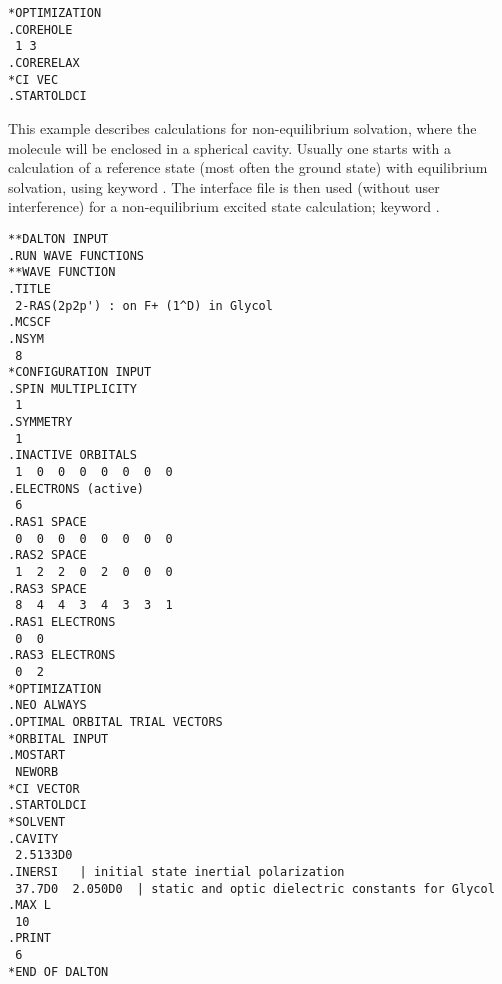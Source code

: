 \begin{verbatim}
*OPTIMIZATION
.COREHOLE
 1 3
.CORERELAX
*CI VEC
.STARTOLDCI
\end{verbatim}
\label{sirius_ex7}

\begin{center}
\end{center}

This example describes calculations for non-equilibrium
solvation, where the mole\-cule will
be enclosed in a spherical cavity. Usually one starts
with a calculation of a reference state (most often the ground
state) with equilibrium solvation, using keyword . The
interface file is then used (without user interference) for a
non-equilibrium excited state calculation; keyword .

\begin{verbatim}
**DALTON INPUT
.RUN WAVE FUNCTIONS
**WAVE FUNCTION
.TITLE
 2-RAS(2p2p') : on F+ (1^D) in Glycol
.MCSCF
.NSYM
 8
*CONFIGURATION INPUT
.SPIN MULTIPLICITY
 1
.SYMMETRY
 1
.INACTIVE ORBITALS
 1  0  0  0  0  0  0  0
.ELECTRONS (active)
 6
.RAS1 SPACE
 0  0  0  0  0  0  0  0
.RAS2 SPACE
 1  2  2  0  2  0  0  0
.RAS3 SPACE
 8  4  4  3  4  3  3  1
.RAS1 ELECTRONS
 0  0
.RAS3 ELECTRONS
 0  2
*OPTIMIZATION
.NEO ALWAYS
.OPTIMAL ORBITAL TRIAL VECTORS
*ORBITAL INPUT
.MOSTART
 NEWORB
*CI VECTOR
.STARTOLDCI
*SOLVENT
.CAVITY
 2.5133D0
.INERSI   | initial state inertial polarization
 37.7D0  2.050D0  | static and optic dielectric constants for Glycol
.MAX L
 10
.PRINT
 6
*END OF DALTON
\end{verbatim}
\label{sirius_ex8}
